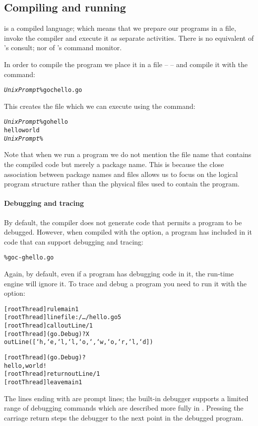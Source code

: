 \subsection{Compiling and running}
\label{first:compiling}
\go is a compiled language; which means that we prepare our programs in a file, invoke the compiler and execute it as separate activities. There is no equivalent of \prolog's consult; nor of \prolog's command monitor.

In order to compile the  program we place it in a file --  -- and compile it with the  command:
\begin{alltt}
\emph{UnixPrompt}\% goc hello.go
\end{alltt}
This creates the file  which we can execute using the  command:
\begin{alltt}
\emph{UnixPrompt}\% go hello
hello world
\emph{UnixPrompt}\%
\end{alltt}
Note that when we run a program we do not mention the file name that contains the compiled code but merely a package name. This is because the close association between package names and files allows us to focus on the logical program structure rather than the physical files used to contain the program.

\paragraph{Debugging and tracing}
By default, the \go compiler does not generate code that permits a \go program to be debugged. However, when compiled with the  option, a \go program has included in it code that can support debugging and tracing:
\begin{alltt}
\% goc -g hello.go
\end{alltt}
Again, by default, even if a program has debugging code in it, the \go run-time engine will ignore it. To trace and debug a program you need to run it with the  option:
\begin{alltt}
[rootThread] rule main 1
[rootThread] line file:/\ldots/hello.go 5
[rootThread] call outLine/1
[rootThread] (go.Debug)? X
outLine([`h,`e,`l,`l,`o,` ,`w,`o,`r,`l,`d])

[rootThread] (go.Debug)? 
hello, world!
[rootThread] return outLine/1
[rootThread] leave main 1
\end{alltt}
The lines ending with  are prompt lines; the built-in debugger supports a limited range of debugging commands which are described more fully in \cite{fgm:go:05}. Pressing the carriage return steps the debugger to the next point in the debugged program.


